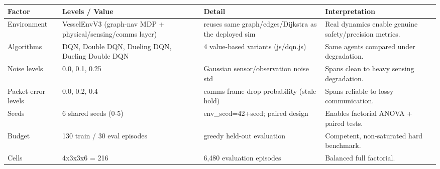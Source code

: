 \begin{tabular}{llll}
\toprule
Factor & Levels / Value & Detail & Interpretation \\
\midrule
Environment & VesselEnvV3 (graph-nav MDP + physical/sensing/comms layer) & reuses same graph/edges/Dijkstra as the deployed sim & Real dynamics enable genuine safety/precision metrics. \\
Algorithms & DQN, Double DQN, Dueling DQN, Dueling Double DQN & 4 value-based variants (js/dqn.js) & Same agents compared under degradation. \\
Noise levels & 0.0, 0.1, 0.25 & Gaussian sensor/observation noise std & Spans clean to heavy sensing degradation. \\
Packet-error levels & 0.0, 0.2, 0.4 & comms frame-drop probability (stale hold) & Spans reliable to lossy communication. \\
Seeds & 6 shared seeds (0-5) & env\_seed=42+seed; paired design & Enables factorial ANOVA + paired tests. \\
Budget & 130 train / 30 eval episodes & greedy held-out evaluation & Competent, non-saturated hard benchmark. \\
Cells & 4x3x3x6 = 216 & 6,480 evaluation episodes & Balanced full factorial. \\
\bottomrule
\end{tabular}
